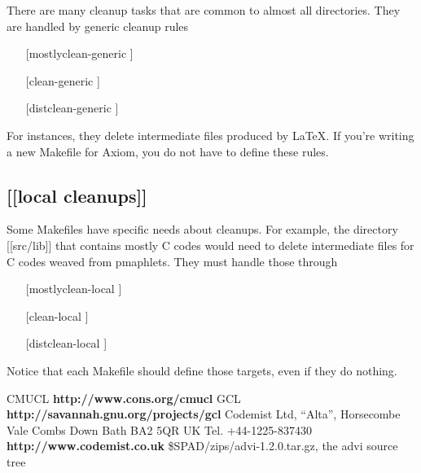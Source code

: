 \documentclass{article}
\begin{document}
There are many cleanup tasks that are common to almost all directories.
They are handled by generic cleanup rules
\begin{itemize}
\item [[mostlyclean-generic]]
\item [[clean-generic]]
\item [[distclean-generic]]
\end{itemize}
For instances, they delete intermediate files produced by \LaTeX{}.
If you're writing a new Makefile for Axiom, you do not have to
define these rules.

\subsection{[[local cleanups]]}

Some Makefiles have specific needs about cleanups.  For example, the
directory [[src/lib]] that contains mostly C codes would need to delete
intermediate files for C codes weaved from pmaphlets.  They must
handle those through
\begin{itemize}
\item [[mostlyclean-local]]
\item [[clean-local]]
\item [[distclean-local]]
\end{itemize}

Notice that each Makefile should define those targets, even if they do
nothing.


\eject
\begin{thebibliography}{99}
 CMUCL {\bf http://www.cons.org/cmucl}
 GCL {\bf http://savannah.gnu.org/projects/gcl}
 Codemist Ltd, ``Alta'', Horsecombe Vale Combs Down
Bath BA2 5QR UK Tel. +44-1225-837430
{\bf http://www.codemist.co.uk}
 \$SPAD/zips/advi-1.2.0.tar.gz, the advi source tree
\end{thebibliography}
\end{document}
